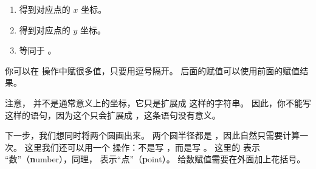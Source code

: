 \eohs

\begin{enumerate}
\item {} 得到对应点的 $x$ 坐标。
\item {} 得到对应点的 $y$ 坐标。
\item {} 等同于 。
\end{enumerate}

\bohs

你可以在  操作中赋很多值，只要用逗号隔开。
后面的赋值可以使用前面的赋值结果。

注意， 并不是通常意义上的坐标，它只是扩展成 \ltz{10pt,20pt} 这样的字符串。
因此，你不能写  这样的语句，因为这个只会扩展成 ，这条语句没有意义。

下一步，我们想同时将两个圆画出来。
两个圆半径都是 ，因此自然只需要计算一次。
这里我们还可以用一个  操作：不是写 ，而是写 。
这里的  表示 “数”（\textbf{n}umber），同理， 表示“点”（\textbf{p}oint）。
给数赋值需要在外面加上花括号。

